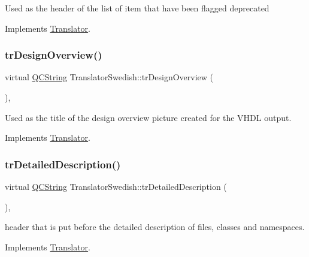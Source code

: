 Used as the header of the list of item that have been flagged deprecated 

Implements \mbox{\hyperlink{class_translator}{Translator}}.

\mbox{\label{class_translator_swedish_a7d7aff0ee97e86d09f7ce0df28ec05ce}} 
\subsubsection{\texorpdfstring{trDesignOverview()}{trDesignOverview()}}
{\footnotesize\ttfamily virtual \mbox{\hyperlink{class_q_c_string}{Q\+C\+String}} Translator\+Swedish\+::tr\+Design\+Overview (\begin{DoxyParamCaption}{ }\end{DoxyParamCaption})\hspace{0.3cm}{\ttfamily [inline]}, {\ttfamily [virtual]}}

Used as the title of the design overview picture created for the V\+H\+DL output. 

Implements \mbox{\hyperlink{class_translator}{Translator}}.

\mbox{\label{class_translator_swedish_adf44ce20dd921e6156d1ff9ff92fff26}} 
\subsubsection{\texorpdfstring{trDetailedDescription()}{trDetailedDescription()}}
{\footnotesize\ttfamily virtual \mbox{\hyperlink{class_q_c_string}{Q\+C\+String}} Translator\+Swedish\+::tr\+Detailed\+Description (\begin{DoxyParamCaption}{ }\end{DoxyParamCaption})\hspace{0.3cm}{\ttfamily [inline]}, {\ttfamily [virtual]}}

header that is put before the detailed description of files, classes and namespaces. 

Implements \mbox{\hyperlink{class_translator}{Translator}}.

\mbox{\label{class_translator_swedish_afda12b1ee189e27b8066612adcfcad23}} 
